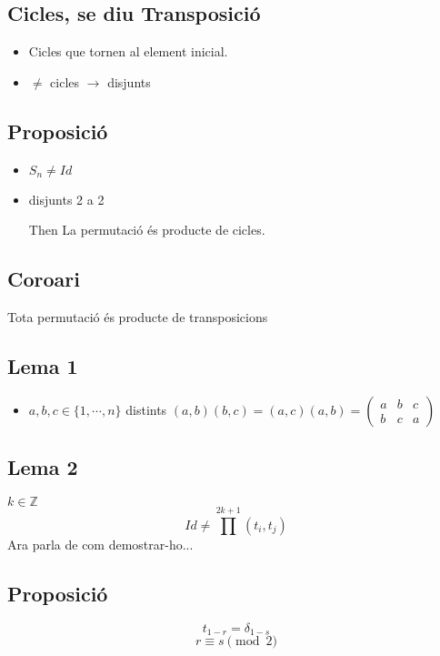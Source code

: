 \documentclass[a4paper,10pt]{article}
\newcommand{\red}[1]{{\color{red}#1}}
\newcommand{\Z}{\mathbb{Z}}
\newcommand{\pM}[1]{\begin{pmatrix}#1\end{pmatrix}}
\begin{document}
\subsection*{Cicles, se diu \red{Transposició}}
\begin{itemize}
\item Cicles que tornen al element inicial.
\item $\neq$ cicles $\to$ \red{disjunts}
\end{itemize}
\subsection*{Proposició}
\begin{itemize}
\item $S_n \neq Id$
\item disjunts 2 a 2
\item[Then] La permutació és producte de cicles.
\end{itemize}
\subsection*{Coro\lgem ari}
Tota permutació és producte de transposicions
\subsection*{Lema 1}
\begin{itemize}
\item $a, b, c \in \{1,\cdots, n\}$ distints
	\subitem $(a, b) (b, c) = (a, c) (a, b) = \pM{a&b&c\\b&c&a}$
\end{itemize}
\subsection*{Lema 2}
$k \in \Z$
$$Id \neq \prod^{2k + 1} (t_i, t_j)$$
Ara parla de com demostrar-ho...\\
\subsection*{Proposició}
$$t_{1-r} = \delta_{1-s}$$
$$r \equiv s \pmod{2} $$
\end{document}
